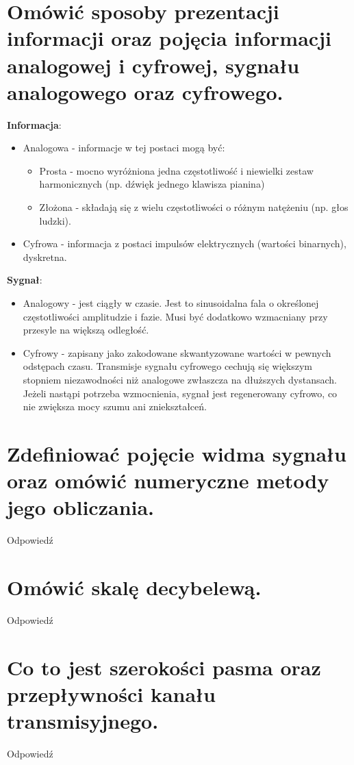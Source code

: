 \documentclass[12pt,a4paper]{article}
\begin{document}
	\section{Omówić sposoby prezentacji informacji oraz pojęcia informacji analogowej i cyfrowej, sygnału analogowego oraz cyfrowego.}
	\textbf{Informacja}:
	\begin{itemize}
		\item Analogowa - informacje w tej postaci mogą być:
		\begin{itemize}
			\item Prosta - mocno wyróżniona jedna częstotliwość i niewielki zestaw harmonicznych (np. dźwięk jednego klawisza pianina)
			\item Złożona - składają się z wielu częstotliwości o różnym natężeniu (np. głos ludzki).
		\end{itemize}
		\item Cyfrowa - informacja z postaci impulsów elektrycznych (wartości binarnych), dyskretna.
	\end{itemize}
	\textbf{Sygnał}:
	\begin{itemize}
		\item Analogowy - jest ciągły w czasie. Jest to sinusoidalna fala o określonej częstotliwości amplitudzie i fazie. Musi być dodatkowo wzmacniany przy przesyle na większą odległość.
		\item Cyfrowy - zapisany jako zakodowane skwantyzowane wartości w pewnych odstępach czasu. Transmisje sygnału cyfrowego cechują się większym stopniem niezawodności niż analogowe zwłaszcza na dłuższych dystansach. Jeżeli nastąpi potrzeba wzmocnienia, sygnał jest regenerowany cyfrowo, co nie zwiększa mocy szumu ani zniekształceń.
	\end{itemize}


	\section{Zdefiniować pojęcie widma sygnału oraz omówić numeryczne metody jego obliczania.}
	Odpowiedź

	\section{Omówić skalę decybelewą.}
	Odpowiedź

	\section{Co to jest szerokości pasma oraz przepływności kanału transmisyjnego.}
	Odpowiedź
\end{document}
